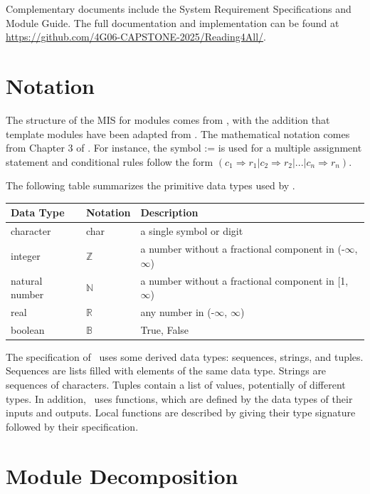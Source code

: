 \documentclass[12pt, titlepage]{article}
\newcommand{\Bool}{\ensuremath{\mathbb{B}}}
\begin{document}
Complementary documents include the System Requirement Specifications
and Module Guide.  The full documentation and implementation can be
found at \url{https://github.com/4G06-CAPSTONE-2025/Reading4All/}.

\section{Notation}

The structure of the MIS for modules comes from \citet{HoffmanAndStrooper1995},
with the addition that template modules have been adapted from
\cite{GhezziEtAl2003}.  The mathematical notation comes from Chapter 3 of
\citet{HoffmanAndStrooper1995}.  For instance, the symbol := is used for a
multiple assignment statement and conditional rules follow the form $(c_1
\Rightarrow r_1 | c_2 \Rightarrow r_2 | ... | c_n \Rightarrow r_n )$.

The following table summarizes the primitive data types used by \progname.

\begin{center}
  \renewcommand{\arraystretch}{1.2}
  \noindent
  \begin{tabular}{l l p{7.5cm}}
    \toprule
    \textbf{Data Type} & \textbf{Notation} & \textbf{Description}\\
    \midrule
    character & char & a single symbol or digit\\
    integer & $\mathbb{Z}$ & a number without a fractional component
    in (-$\infty$, $\infty$) \\
    natural number & $\mathbb{N}$ & a number without a fractional
    component in [1, $\infty$) \\
    real & $\mathbb{R}$ & any number in (-$\infty$, $\infty$)\\
    boolean & \Bool & True, False \\
    \bottomrule
  \end{tabular}
\end{center}

\noindent
The specification of \progname \ uses some derived data types:
sequences, strings, and
tuples. Sequences are lists filled with elements of the same data type. Strings
are sequences of characters. Tuples contain a list of values, potentially of
different types. In addition, \progname \ uses functions, which
are defined by the data types of their inputs and outputs. Local functions are
described by giving their type signature followed by their specification.

\section{Module Decomposition}
\end{document}
